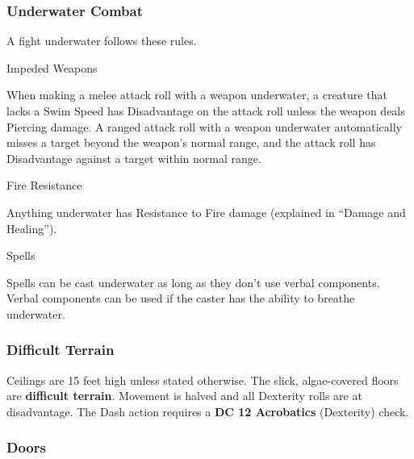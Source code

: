 \documentclass[10pt,twocolumn]{article}
\newcommand{\stickysubsubsection}{\needspace{3\baselineskip}}
\let\oldtextbf\textbf
\renewcommand{\textbf}[1]{\oldtextbf{{#1}}}
\begin{document}
\subsubsection{Underwater Combat}\label{underwater-combat}

A fight underwater follows these rules.

\vspace{6pt}\noindent\stickysubsubsection

{\headerfont\normalsize \color{subsubsectioncolor}Impeded Weapons}

\par

When making a melee attack roll with a weapon underwater, a creature
that lacks a Swim Speed has Disadvantage on the attack roll unless the
weapon deals Piercing damage. A ranged attack roll with a weapon
underwater automatically misses a target beyond the weapon's normal
range, and the attack roll has Disadvantage against a target within
normal range.

\vspace{6pt}\noindent\stickysubsubsection

{\headerfont\normalsize \color{subsubsectioncolor}Fire Resistance}

\par

Anything underwater has Resistance to Fire damage (explained in ``Damage
and Healing'').

\vspace{6pt}\noindent\stickysubsubsection

{\headerfont\normalsize \color{subsubsectioncolor}Spells}

\par

Spells can be cast underwater as long as they don't use verbal
components. Verbal components can be used if the caster has the ability
to breathe underwater.~

\subsubsection{Difficult Terrain}\label{difficult-terrain}

Ceilings are 15 feet high unless stated otherwise. The slick,
algae-covered floors are \textbf{difficult terrain}. Movement is halved
and all Dexterity rolls are at disadvantage. The Dash action requires a
\textbf{DC 12 Acrobatics} (Dexterity) check.

\subsubsection{Doors}\label{doors}
\end{document}
